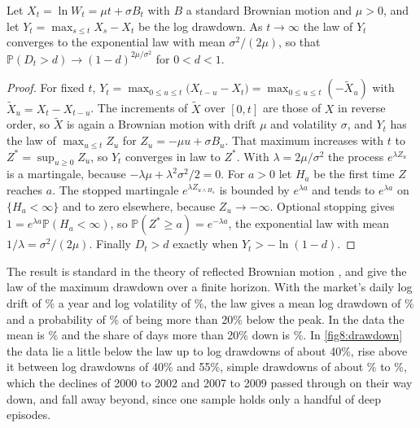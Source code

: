 \begin{chapterrefs}
\begin{proposition}\label{prop8:ddlaw}
Let $X_t=\ln W_t=\mu t+\sigma B_t$ with $B$ a standard Brownian motion and $\mu>0$, and let
$Y_t=\max_{s\le t}X_s-X_t$ be the log drawdown. As $t\to\infty$ the law of $Y_t$ converges to the
exponential law with mean $\sigma^2/(2\mu)$, so that
$\mathbb P(D_t>d)\to(1-d)^{2\mu/\sigma^2}$ for $0<d<1$.
\end{proposition}
\begin{proof}
For fixed $t$, $Y_t=\max_{0\le u\le t}\bigl(X_{t-u}-X_t\bigr)=\max_{0\le u\le t}(-\tilde X_u)$ with
$\tilde X_u=X_t-X_{t-u}$. The increments of $\tilde X$ over $[0,t]$ are those of $X$ in reverse order, so
$\tilde X$ is again a Brownian motion with drift $\mu$ and volatility $\sigma$, and $Y_t$ has the law
of $\max_{u\le t}Z_u$ for $Z_u=-\mu u+\sigma B_u$. That maximum increases with $t$ to
$Z^*=\sup_{u\ge0}Z_u$, so $Y_t$ converges in law to $Z^*$. With $\lambda=2\mu/\sigma^2$ the process
$e^{\lambda Z_u}$ is a martingale, because $-\lambda\mu+\lambda^2\sigma^2/2=0$. For $a>0$ let $H_a$ be
the first time $Z$ reaches $a$. The stopped martingale $e^{\lambda Z_{u\wedge H_a}}$ is bounded by
$e^{\lambda a}$ and tends to $e^{\lambda a}$ on $\{H_a<\infty\}$ and to zero elsewhere, because $Z_u\to-\infty$.
Optional stopping gives $1=e^{\lambda a}\mathbb P(H_a<\infty)$, so $\mathbb P(Z^*\ge a)=e^{-\lambda a}$, the
exponential law with mean $1/\lambda=\sigma^2/(2\mu)$. Finally $D_t>d$ exactly when
$Y_t>-\ln(1-d)$.
\end{proof}

The result is standard in the theory of reflected Brownian motion \parencite{harrison1985}, and
\textcite{magdon2004} give the law of the maximum drawdown over a finite horizon. With the market's
daily log drift of \ddLogMu\% a year and log volatility of \ddLogVol\%, the law gives a mean log
drawdown of \ddLawMean\% and a probability of \ddLawTwenty\% of being more than 20\% below the peak.
In the data the mean is \ddEmpMean\% and the share of days more than 20\% down is \ddShareTwenty\%.
In \cref{fig8:drawdown} the data lie a little below the law up to log drawdowns of about 40\%, rise
above it between log drawdowns of 40\% and 55\%, simple drawdowns of about \ddSimpleLo\% to
\ddSimpleHi\%, which the declines of 2000 to 2002 and 2007 to 2009 passed through on their way down,
and fall away beyond, since one sample holds only a handful of deep episodes.


\end{chapterrefs}
